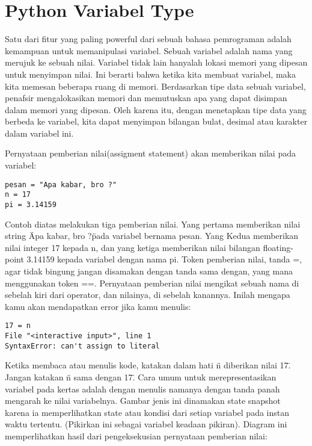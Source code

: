 \section{Python Variabel Type}
Satu dari fitur yang paling powerful dari sebuah bahasa pemrograman adalah kemampuan untuk memanipulasi variabel. Sebuah variabel adalah nama yang merujuk ke sebuah nilai. Variabel tidak lain hanyalah lokasi memori yang dipesan untuk menyimpan nilai. Ini berarti bahwa ketika kita membuat variabel, maka kita memesan beberapa ruang di memori. Berdasarkan tipe data sebuah variabel, penafsir mengalokasikan memori dan memutuskan apa yang dapat disimpan dalam memori yang dipesan. Oleh karena itu, dengan menetapkan tipe data yang berbeda ke variabel, kita dapat menyimpan bilangan bulat, desimal atau karakter dalam variabel ini.

Pernyataan pemberian nilai(assigment statement) akan memberikan nilai pada variabel: 
\begin{verbatim}
pesan = "Apa kabar, bro ?" 
n = 17  
pi = 3.14159 
\end{verbatim}
Contoh diatas melakukan tiga pemberian nilai. Yang pertama memberikan nilai string \"Apa kabar, bro ?\" pada variabel bernama pesan. Yang Kedua memberikan nilai integer 17 kepada n, dan yang ketiga memberikan nilai bilangan floating-point 3.14159 kepada variabel dengan nama pi.
Token pemberian nilai, tanda =, agar tidak bingung jangan disamakan dengan tanda sama dengan, yang mana menggunakan token ==. Pernyataan pemberian nilai mengikat sebuah nama di sebelah kiri dari operator, dan nilainya, di sebelah kanannya. Inilah mengapa kamu akan mendapatkan error jika kamu menulis: 
\begin{verbatim}
17 = n 
File "<interactive input>", line 1 
SyntaxError: can't assign to literal 
\end{verbatim}
Ketika membaca atau menulis kode, katakan dalam hati \"n diberikan nilai 17\". Jangan katakan \"n sama dengan 17\".
\vspace{12pt}
\noindent 
Cara umum untuk merepresentasikan variabel pada kertas adalah dengan menulis namanya dengan tanda panah mengarah ke nilai variabelnya. Gambar jenis ini dinamakan $  $state snapshot $  $karena ia memperlihatkan state atau kondisi dari setiap variabel pada instan waktu tertentu. (Pikirkan ini sebagai variabel keadaan pikiran). Diagram ini memperlihatkan hasil dari pengeksekusian pernyataan pemberian nilai: \par
\vspace{12pt}
\vspace{12pt}
